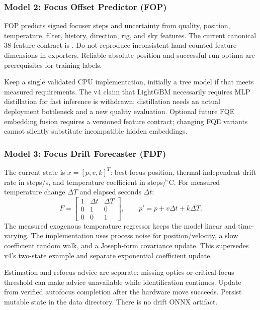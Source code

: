 \documentclass[11pt,a4paper]{article}
\newcommand{\pathref}[1]{\texttt{\path{#1}}}
\begin{document}
\subsubsection{Model 2: Focus Offset Predictor (FOP)}
FOP predicts signed focuser steps and uncertainty from quality, position,
temperature, filter, history, direction, rig, and sky features. The current
canonical 38-feature contract is \pathref{ml/contracts/fop_features.py}.
Do not reproduce inconsistent hand-counted feature dimensions in exporters.
Reliable absolute position and successful run optima are prerequisites for
training labels.

Keep a single validated CPU implementation, initially a tree model if that
meets measured requirements. The v4 claim that LightGBM necessarily requires
MLP distillation for fast inference is withdrawn: distillation needs an actual
deployment bottleneck and a new quality evaluation. Optional future FQE
embedding fusion requires a versioned feature contract; changing FQE variants
cannot silently substitute incompatible hidden embeddings.

\subsubsection{Model 3: Focus Drift Forecaster (FDF)}
The current state is $x=[p,v,k]^T$: best-focus position, thermal-independent
drift rate in steps/s, and temperature coefficient in steps/$^\circ$C.
For measured temperature change $\Delta T$ and elapsed seconds $\Delta t$:
\[
F=\begin{bmatrix}1&\Delta t&\Delta T\\0&1&0\\0&0&1\end{bmatrix},
\qquad p'=p+v\Delta t+k\Delta T.
\]
The measured exogenous temperature regressor keeps the model linear and
time-varying. The implementation uses process noise for position/velocity,
a slow coefficient random walk, and a Joseph-form covariance update. This
supersedes v4's two-state example and separate exponential coefficient update.

Estimation and refocus advice are separate: missing optics or critical-focus
threshold can make advice unavailable while identification continues.
Update from verified autofocus completion after the hardware move succeeds.
Persist mutable state in the data directory. There is no drift ONNX artifact.
\end{document}
